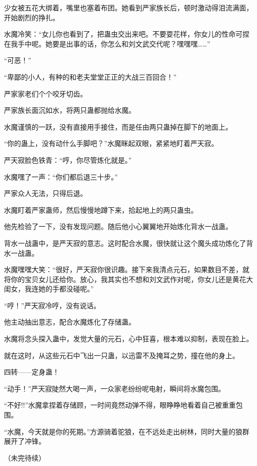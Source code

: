 \begin{this_body}
少女被五花大绑着，嘴里也塞着布团。她看到严家族长后，顿时激动得泪流满面，开始剧烈的挣扎。

水魔冷笑：“女儿你也看到了，把蛊虫交出来吧。不要耍花样，你女儿的性命可捏在我手中呢。她要是出事的话，你怎么和刘文武交代呢？嘿嘿嘿……”

“可恶！”

“卑鄙的小人，有种的和老夫堂堂正正的大战三百回合！”

严家家老们个个咬牙切齿。

严家族长面沉如水，将两只蛊都抛给水魔。

水魔谨慎的一跃，没有直接用手接住，而是任由两只蛊掉在脚下的地面上。

“你的蛊上，没有动什么手脚吧？”水魔眯起双眼，紧紧地盯着严天寂。

严天寂脸色铁青：“哼，你尽管炼化就是。”

水魔嘿了一声：“你们都后退三十步。”

严家众人无法，只得后退。

水魔盯着严家蛊师，然后慢慢地蹲下来，拾起地上的两只蛊虫。

他先检验了一下，没有发现问题。随后他小心翼翼地开始炼化背水一战蛊。

背水一战蛊中，是严天寂的意志。这时配合水魔，很快就让这个魔头成功炼化了背水一战蛊。

水魔嘿嘿大笑：“很好，严天寂你很识趣。接下来我清点元石，如果数目不差，就将你的宝贝女儿还给你。放心，我其实也不想和刘文武作对呢，你女儿还是黄花大闺女，我连她的手都没碰呢。”

“哼！”严天寂冷哼，没有说话。

他主动抽出意志，配合水魔炼化了存储蛊。

水魔将念头探入蛊中，发觉大量的元石，心中狂喜，根本难以抑制，表现在脸上。

就在这时，从这些元石中飞出一只蛊，以迅雷不及掩耳之势，撞在他的身上。

四转——定身蛊！

“动手！”严天寂陡然大喝一声，一众家老纷纷呢电射，瞬间将水魔包围。

“不好!!”水魔拿捏着存储顾，一时间竟然动弹不得，眼睁睁地看着自己被重重包围。

“水魔，今天就是你的死期。”方源骑着驼狼，在不远处走出树林，同时大量的狼群展开了冲锋。

（未完待续）

\end{this_body}


